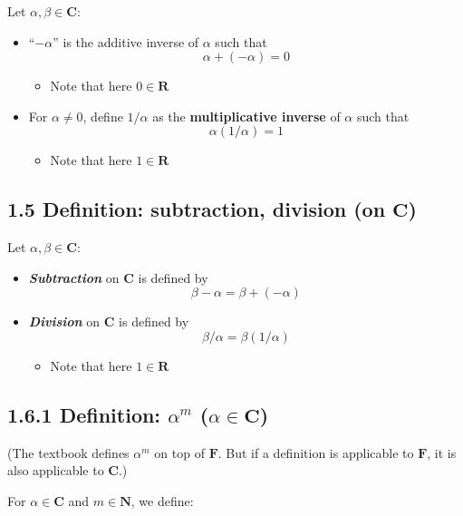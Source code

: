 \documentclass[12pt, letterpaper, oneside]{book}
\begin{document}
Let $\alpha, \beta \in \mathbf{C}$:

\begin{itemize}
  \item ``$-\alpha$'' is the additive inverse of $\alpha$ such that
    \[ \alpha + (-\alpha) = 0 \]
    \begin{itemize}
      \item Note that here $0 \in \mathbf{R}$
    \end{itemize}
  \item For $\alpha \neq 0$, define $1/\alpha$ as the \textbf{multiplicative
    inverse} of $\alpha$ such that
    \[ \alpha(1/\alpha) = 1 \]
    \begin{itemize}
      \item Note that here $1 \in \mathbf{R}$
    \end{itemize}
\end{itemize}

\subsection{1.5 Definition: subtraction, division (on $\mathbf{C}$)}

Let $\alpha, \beta \in \mathbf{C}$:

\begin{itemize}
  \item \textbf{\textit{Subtraction}} on $\mathbf{C}$ is defined by
    \[ \beta - \alpha = \beta + (-\alpha) \]
  \item \textbf{\textit{Division}} on $\mathbf{C}$ is defined by
    \[ \beta/\alpha = \beta(1/\alpha) \]
    \begin{itemize}
      \item Note that here $1 \in \mathbf{R}$
    \end{itemize}
\end{itemize}

\subsection{1.6.1 Definition: $\alpha^m$ ($\alpha \in \mathbf{C}$)}

(The textbook defines $\alpha ^m$ on top of $\mathbf{F}$. But if a definition
is applicable to $\mathbf{F}$, it is also applicable to $\mathbf{C}$.)

For $\alpha \in \mathbf{C}$ and $m \in \mathbf{N}$, we define:
\end{document}
